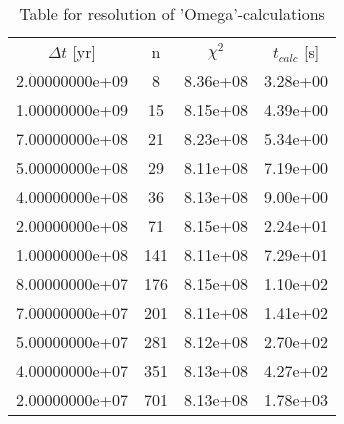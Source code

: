 \begin{table}[]
\centering
\caption{Table for resolution of 'Omega'-calculations}
\label{tab:omega-timestep}
\begin{tabular}{cccc}
$\Delta t$ [yr] & n & $\chi^2$ & $t_{calc}$ [s] \\
2.00000000e+09 & 8 & 8.36e+08 & 3.28e+00 \\
1.00000000e+09 & 15 & 8.15e+08 & 4.39e+00 \\
7.00000000e+08 & 21 & 8.23e+08 & 5.34e+00 \\
5.00000000e+08 & 29 & 8.11e+08 & 7.19e+00 \\
4.00000000e+08 & 36 & 8.13e+08 & 9.00e+00 \\
2.00000000e+08 & 71 & 8.15e+08 & 2.24e+01 \\
1.00000000e+08 & 141 & 8.11e+08 & 7.29e+01 \\
8.00000000e+07 & 176 & 8.15e+08 & 1.10e+02 \\
7.00000000e+07 & 201 & 8.11e+08 & 1.41e+02 \\
5.00000000e+07 & 281 & 8.12e+08 & 2.70e+02 \\
4.00000000e+07 & 351 & 8.13e+08 & 4.27e+02 \\
2.00000000e+07 & 701 & 8.13e+08 & 1.78e+03 \\
\end{tabular}
\end{table}
